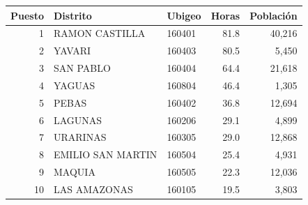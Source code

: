 \begin{tabular}{rllrr}
\toprule
Puesto & Distrito & Ubigeo & Horas & Población \\
\midrule
1 & RAMON CASTILLA & 160401 & 81.8 & 40,216 \\
2 & YAVARI & 160403 & 80.5 & 5,450 \\
3 & SAN PABLO & 160404 & 64.4 & 21,618 \\
4 & YAGUAS & 160804 & 46.4 & 1,305 \\
5 & PEBAS & 160402 & 36.8 & 12,694 \\
6 & LAGUNAS & 160206 & 29.1 & 4,899 \\
7 & URARINAS & 160305 & 29.0 & 12,868 \\
8 & EMILIO SAN MARTIN & 160504 & 25.4 & 4,931 \\
9 & MAQUIA & 160505 & 22.3 & 12,036 \\
10 & LAS AMAZONAS & 160105 & 19.5 & 3,803 \\
\bottomrule
\end{tabular}
